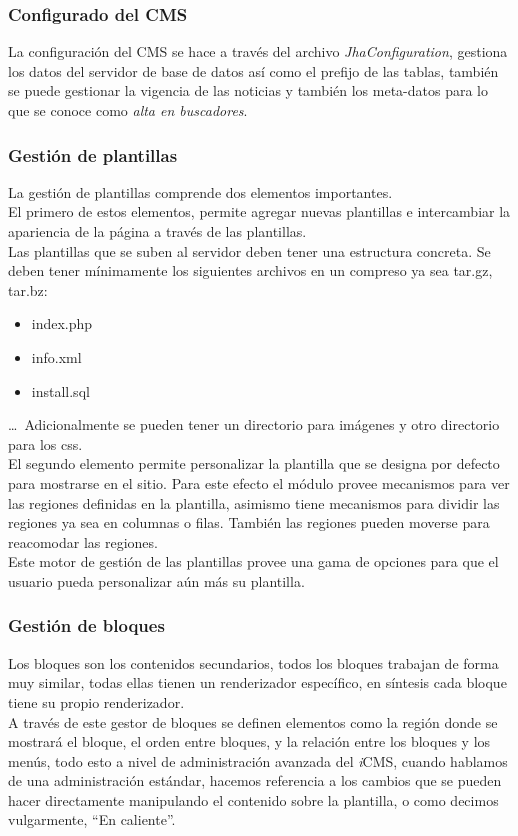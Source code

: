 \subsubsection{Configurado del CMS}
La configuraci\'on del CMS se hace a trav\'es del archivo \textit{JhaConfiguration}, gestiona los datos del servidor de base de datos as\'i como el prefijo de las tablas, tambi\'en se puede gestionar la vigencia de las noticias y tambi\'en los meta-datos para lo que se conoce como \textit{alta en buscadores}.

\subsubsection{Gesti\'on de plantillas}
La gesti\'on de plantillas comprende dos elementos importantes.\\
El primero de estos elementos, permite agregar nuevas plantillas e intercambiar la apariencia de la p\'agina a trav\'es de las plantillas.\\
Las plantillas que se suben al servidor deben tener una estructura concreta. Se deben tener m\'inimamente los siguientes archivos en un compreso ya sea tar.gz, tar.bz:
\begin{itemize}
\item index.php
\item info.xml
\item install.sql
\end{itemize}
\ldots\ Adicionalmente se pueden tener un directorio para im\'agenes y otro directorio para los css.\\
El segundo elemento permite personalizar la plantilla que se designa por defecto para mostrarse en el sitio. Para este efecto el m\'odulo provee mecanismos para ver las regiones definidas en la plantilla, asimismo tiene mecanismos para dividir las regiones ya sea en columnas o filas. Tambi\'en las regiones pueden moverse para reacomodar las regiones.\\
Este motor de gesti\'on de las plantillas provee una gama de opciones para que el usuario pueda personalizar a\'un m\'as su plantilla.

\subsubsection{Gesti\'on de bloques}
Los bloques son los contenidos secundarios, todos los bloques trabajan de forma muy similar, todas ellas tienen un renderizador espec\'ifico, en s\'intesis cada bloque tiene su propio renderizador.\\
A trav\'es de este gestor de bloques se definen elementos como la regi\'on donde se mostrar\'a el bloque, el orden entre bloques, y la relaci\'on entre los bloques y los men\'us, todo esto a nivel de administraci\'on avanzada del \textit{i}CMS, cuando hablamos de una administraci\'on est\'andar, hacemos referencia a los cambios que se pueden hacer directamente manipulando el contenido sobre la plantilla, o como decimos vulgarmente, ``En caliente''.

